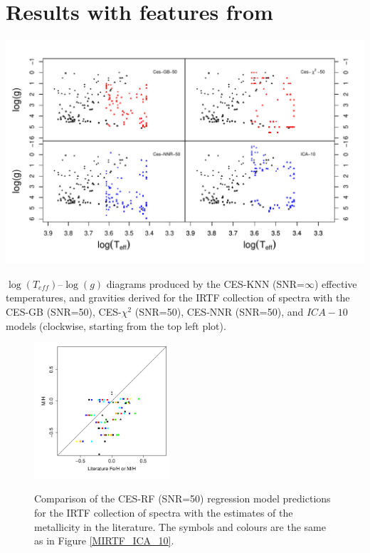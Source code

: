 
  \section{Results with features from \protect\cite{cesetti}}
\label{app:figures:irtf}


\begin {figure*}
 \centering
  \includegraphics[width=\textwidth]{figs/irtf-figs/irtf-Cesseti.pdf}
  \caption{$\log(T_{eff})$--$\log(g)$ diagrams produced by the CES-KNN
    (SNR=$\infty$) effective temperatures, and gravities derived for
    the IRTF collection of spectra with the CES-GB (SNR=50),
    CES-$\chi^2$ (SNR=50), CES-NNR (SNR=50), and $ICA-10$ models
    (clockwise, starting from the top left plot).}
 \label{fig:irtf-ces}
\end {figure*}



\begin {figure}
\centering
\includegraphics[width=0.45\textwidth]{figs/irtf-figs/M-CES.pdf}
\caption{Comparison of the CES-RF (SNR=50) regression model
  predictions for the IRTF collection of spectra with the estimates of
  the metallicity in the literature. The symbols and colours are the
  same as in Figure \ref{MIRTF_ICA_10}.}
\label{fig:irtf-ces-met}
\end {figure}


